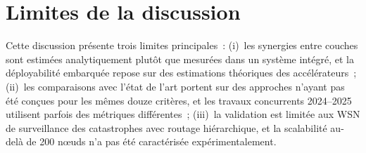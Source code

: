 \section{Limites de la discussion}\label{sec:disc-limites}

Cette discussion présente trois limites principales~: (i)~les synergies entre couches sont estimées analytiquement plutôt que mesurées dans un système intégré, et la déployabilité embarquée repose sur des estimations théoriques des accélérateurs~; (ii)~les comparaisons avec l'état de l'art portent sur des approches n'ayant pas été conçues pour les mêmes douze critères, et les travaux concurrents 2024--2025 utilisent parfois des métriques différentes~; (iii)~la validation est limitée aux WSN de surveillance des catastrophes avec routage hiérarchique, et la scalabilité au-delà de 200 n\oe{}uds n'a pas été caractérisée expérimentalement.
